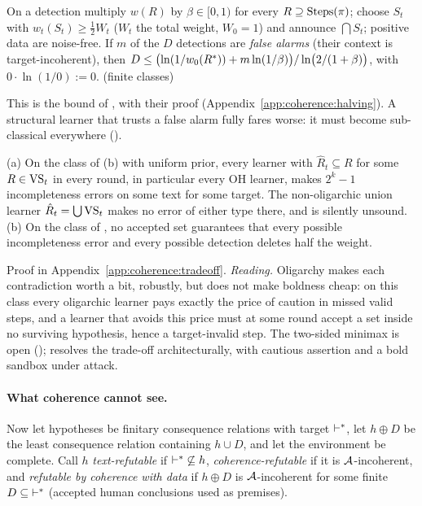 \begin{theorem}\label{thm:coherence:robust}
On a detection multiply $w(R)$ by $\beta\in[0,1)$ for every $R\supseteq\mathrm{Steps}(\pi)$; choose $S_t$ with $w_t(S_t)\ge\frac12W_t$ ($W_t$ the total weight, $W_0=1$) and announce $\bigcap S_t$; positive data are noise-free. If $m$ of the $D$ detections are \emph{false alarms} (their context is target-incoherent), then
$D\le\bigl(\ln(1/w_0(R^{*}))+m\ln(1/\beta)\bigr)/\ln\bigl(2/(1+\beta)\bigr)$, with $0\cdot\ln(1/0):=0$. \hfill{} (finite classes)
\end{theorem}

This is the bound of \citet{littlestone1994weighted}, with their proof (Appendix~\ref{app:coherence:halving}). A structural learner that trusts a false alarm fully fares worse: it must become sub-classical everywhere ().

\begin{proposition}\label{prop:coherence:tradeoff}
\textup{(a)} On the class of (b) with uniform prior, every learner with $\hat R_t\subseteq R$ for some $R\in\mathrm{VS}_t$ in every round, in particular every OH learner, makes $2^k-1$ incompleteness errors on some text for some target. The non-oligarchic union learner $\hat R_t=\bigcup\mathrm{VS}_t$ makes no error of either type there, and is silently unsound.
\textup{(b)} On the class of , no accepted set guarantees that every possible incompleteness error and every possible detection deletes half the weight.
\end{proposition}

Proof in Appendix~\ref{app:coherence:tradeoff}. \emph{Reading.} Oligarchy makes each contradiction worth a bit, robustly, but does not make boldness cheap: on this class every oligarchic learner pays exactly the price of caution in missed valid steps, and a learner that avoids this price must at some round accept a set inside no surviving hypothesis, hence a target-invalid step. The two-sided minimax is open ();  resolves the trade-off architecturally, with cautious assertion and a bold sandbox under attack.

\paragraph{What coherence cannot see.} Now let hypotheses be finitary consequence relations with target $\vdash^{*}$, let $h\oplus D$ be the least consequence relation containing $h\cup D$, and let the environment be complete. Call $h$ \emph{text-refutable} if ${\vdash^{*}}\not\subseteq h$, \emph{coherence-refutable} if it is $\mathcal{A}$-incoherent, and \emph{refutable by coherence with data} if $h\oplus D$ is $\mathcal{A}$-incoherent for some finite $D\subseteq{\vdash^{*}}$ (accepted human conclusions used as premises).

